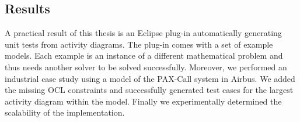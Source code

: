 \subsection{Results}
A practical result of this thesis is an Eclipse plug-in automatically generating unit tests from activity diagrams. The plug-in comes with a set of example models. Each example is an instance of a different mathematical problem and thus needs another solver to be solved successfully. Moreover, we performed an industrial case study using a model of the PAX-Call system in Airbus. We added the missing OCL constraints and successfully generated test cases for the largest activity diagram within the model. Finally we experimentally determined the scalability of the implementation.

